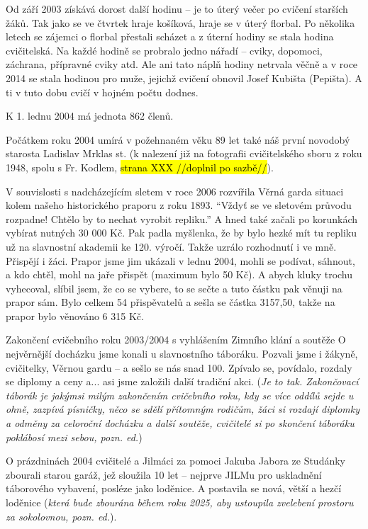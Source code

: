 Od září 2003 získává dorost další hodinu -- je to úterý večer po cvičení
starších žáků. Tak jako se ve čtvrtek hraje košíková, hraje se v úterý
florbal. Po několika letech se zájemci o florbal přestali scházet a z
úterní hodiny se stala hodina cvičitelská. Na každé hodině se probralo
jedno nářadí -- cviky, dopomoci, záchrana, přípravné cviky atd. Ale ani
tato náplň hodiny netrvala věčně a v roce 2014 se stala hodinou pro
muže, jejichž cvičení obnovil Josef Kubišta (Pepišta). A ti v tuto dobu
cvičí v hojném počtu dodnes.

K 1. lednu 2004 má jednota 862 členů.

Počátkem roku 2004 umírá v požehnaném věku 89 let také náš první
novodobý starosta Ladislav Mrklas st. (k nalezení již na fotografii
cvičitelského sboru z roku 1948, spolu s Fr. Kodlem, \hl{strana XXX
//doplnil po sazbě//}).

V souvislosti s nadcházejícím sletem v roce 2006 rozvířila Věrná garda
situaci kolem našeho historického praporu z roku 1893. ``Vždyť se ve
sletovém průvodu rozpadne! Chtělo by to nechat vyrobit repliku.'' A hned
také začali po korunkách vybírat nutných 30 000 Kč. Pak padla myšlenka,
že by bylo hezké mít tu repliku už na slavnostní akademii ke 120.
výročí. Takže uzrálo rozhodnutí i ve mně. Přispějí i žáci. Prapor jsme
jim ukázali v lednu 2004, mohli se podívat, sáhnout, a kdo chtěl, mohl
na jaře přispět (maximum bylo 50 Kč). A abych kluky trochu vyhecoval,
slíbil jsem, že co se vybere, to se sečte a tuto částku pak věnuji na
prapor sám. Bylo celkem 54 přispěvatelů a sešla se částka 3157,50, takže
na prapor bylo věnováno 6 315 Kč.

Zakončení cvičebního roku 2003/2004 s vyhlášením Zimního klání a soutěže
O nejvěrnější docházku jsme konali u slavnostního táboráku. Pozvali jsme
i žákyně, cvičitelky, Věrnou gardu -- a sešlo se nás snad 100. Zpívalo
se, povídalo, rozdaly se diplomy a ceny a... asi jsme založili další
tradiční akci. (\emph{Je to tak. Zakončovací táborák je jakýmsi milým
zakončením cvičebního roku, kdy se více oddílů sejde u ohně, zazpívá
písničky, něco se sdělí přítomným rodičům, žáci si rozdají diplomky a
odměny za celoroční docházku a další soutěže, cvičitelé si po skončení
táboráku poklábosí mezi sebou, pozn. ed.})

O prázdninách 2004 cvičitelé a Jilmáci za pomoci Jakuba Jabora ze
Studánky zbourali starou garáž, jež sloužila 10 let -- nejprve JILMu pro
uskladnění táborového vybavení, posléze jako loděnice. A postavila se
nová, větší a hezčí loděnice (\emph{která bude zbourána během roku 2025,
aby ustoupila zvelebení prostoru za sokolovnou, pozn. ed.}).

